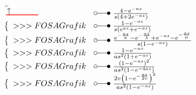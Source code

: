 \begin{footnotesize}
\[\begin{array}{@{}l@{ ~ \laplace ~ }l@{}}
\begin{tikzpicture}[domain=0:5, scale=\graphtabscale, every node/.style={scale=\graphtabscale}]
    \draw[->] (0,-0.1) -- (0,1.2) node[above left] {$f(t)$};
    \draw[-] (-0.1,1) node[left] {$1$} -- (0.1,1);
    \draw[thick, red]
        (-0.5,0)
        --
        (5,0);
\end{tikzpicture} &
    \frac{4 - e^{-as}}{s (4 + 2 e^{-as})} \\
\left\lbrace\begin{array}{l}
>>>FOSA Grafik \\
\end{array}\right. &
    \frac{1 - e^{-as}}{s (e^{as} + e^{-as})} \\
\left\lbrace\begin{array}{l}
>>>FOSA Grafik \\
\end{array}\right. &
    \frac{e^{-\frac{as}{\kappa}} - e^{-\frac{as}{\lambda}} + e^{-as} - e^{-\frac{as}{\mu}}}{s (1 - e^{-as})} \\
\left\lbrace\begin{array}{l}
>>>FOSA Grafik \\
\end{array}\right. &
    \frac{1 - e^{-as}}{as^2 (1 + e^{-as})} \\
\left\lbrace\begin{array}{l}
>>>FOSA Grafik \\
\end{array}\right. &
    \frac{(1 - e^{-as})^2}{as^2 (1 - e^{-4as})} \\
\left\lbrace\begin{array}{l}
>>>FOSA Grafik \\
\end{array}\right. &
    \frac{2v \left(1 - e^{-\frac{as}{2v}}\right)^2}{as^2 (1 - e^{-as})} \\
\end{array} \]


\end{footnotesize}
